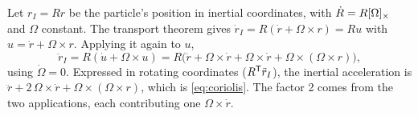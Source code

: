 \begin{solutions}
  \item Let $r_I = Rr$ be the particle's position in inertial coordinates, with $\dot R = R[\Omega]_{\times}$ and $\Omega$ constant. The transport theorem gives
        $\dot r_I = R(\dot r + \Omega\times r) = Ru$ with $u = \dot r + \Omega\times r$. Applying it again to $u$,
        \[
          \ddot r_I = R(\dot u + \Omega\times u) = R\big(\ddot r + \Omega\times\dot r + \Omega\times\dot r + \Omega\times(\Omega\times r)\big),
        \]
        using $\dot\Omega = 0$. Expressed in rotating coordinates ($R^{\mathsf{T}}\ddot r_I$), the inertial acceleration is
        $\ddot r + 2\,\Omega\times\dot r + \Omega\times(\Omega\times r)$, which is \eqref{eq:coriolis}. The factor 2 comes from the two applications, each contributing
        one $\Omega\times\dot r$.
\end{solutions}
